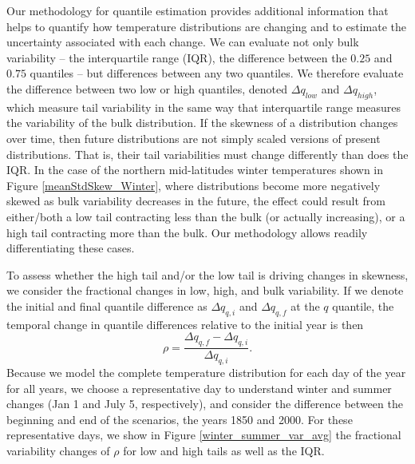 \documentclass{ametsoc}
\begin{document}
Our methodology for quantile estimation provides additional information that helps to
 quantify how temperature distributions are changing and to estimate the uncertainty associated with each change. 
We can evaluate not only bulk variability  -- the interquartile range (IQR), the difference between the $0.25$ and $0.75$ quantiles -- but differences between any two quantiles. 
We therefore evaluate the difference between two low or high quantiles, denoted $\Delta q_{low}$ and $\Delta q_{high}$, which measure tail variability in the same way that interquartile range measures the variability of the bulk distribution.
If the skewness of a distribution changes over time, then future distributions are not simply scaled versions of present distributions. That is, their tail variabilities must change differently than does the IQR.
  In the case of the northern mid-latitudes winter temperatures shown in Figure \ref{meanStdSkew_Winter}, where distributions become more negatively skewed as bulk variability decreases in the future, the effect could result from either/both a low tail contracting less than the bulk (or actually increasing), or a high tail contracting more than the bulk. Our methodology allows readily differentiating these cases.

To assess whether the high tail and/or the low tail is driving changes in skewness, we consider the fractional changes in low, high, and bulk variability.
If we denote the initial and final quantile difference as $\Delta q_{q, i}$ and $\Delta q_{q, f}$ at the $q$ quantile, the temporal change in quantile differences relative to the initial year is then
\begin{equation}
	\rho = \frac{\Delta q_{q, f} - \Delta q_{q, i}}{\Delta q_{q, i}}.
\label{eq:relnorm}
\end{equation}
 Because we model the complete temperature distribution for each day of the year for all years, we choose a representative day to understand winter and summer changes (Jan 1 and July 5, respectively), and consider the difference between the beginning and end of the scenarios, the years 1850 and 2000. For these representative days, we show in Figure \ref{winter_summer_var_avg} the fractional variability changes of $\rho$ for low and high tails as well as the IQR. 
\end{document}
